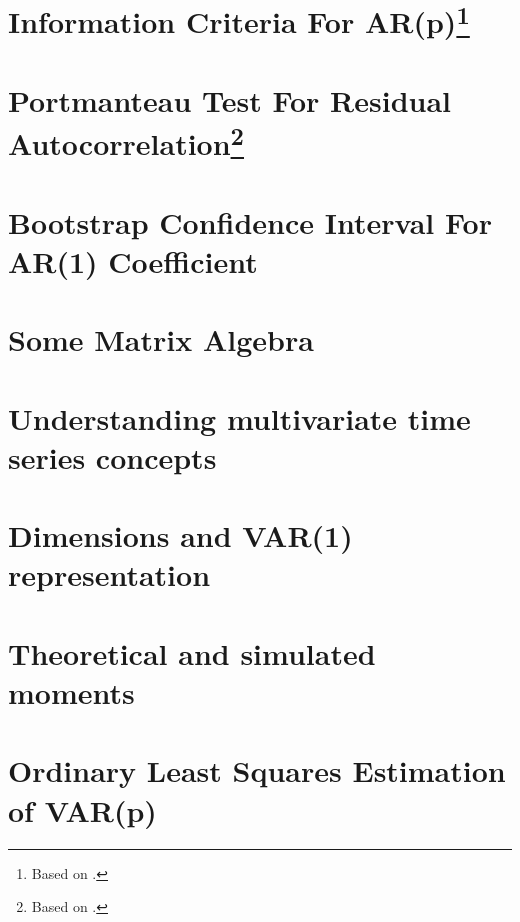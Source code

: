 \documentclass[a4paper]{scrartcl}
\newif\ifpartSVAR
\begin{document}
    \section[Information Criteria For AR(p)]{Information Criteria For AR(p)\footnote{Based on \citet{Luetkepohl.2004}.}}\label{ex:InfoCriteriaARp}
    
    
    \section[Portmanteau Test For Residual Autocorrelation]{Portmanteau Test For Residual Autocorrelation\footnote{Based on \citet{Luetkepohl.2004}.}}\label{ex:Portmanteau}
    
    
    \section[Bootstrap Confidence Interval For AR(1) Coefficient]{Bootstrap Confidence Interval For AR(1) Coefficient}\label{ex:BootstrapCI}
    
\fi


\ifpartSVAR
    \section{Some Matrix Algebra}
    
    
    \section{Understanding multivariate time series concepts}
    
    
    \section{Dimensions and VAR(1) representation}
    
    
    \section{Theoretical and simulated moments}
    
    
    \section{Ordinary Least Squares Estimation of VAR(p)}
    
    
\end{document}
